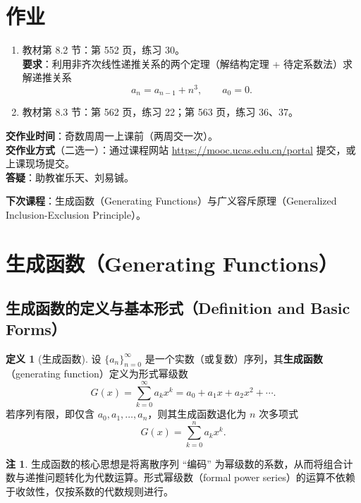 \documentclass[UTF8,11pt,a4paper]{ctexbook}   %
\theoremstyle{definition}
\newtheorem{definition}{定义}[section]
\newtheorem{remark}{注}[section]
\begin{document}
\section*{作业}

\begin{enumerate}
    \item 教材第 8.2 节：第 552 页，练习 30。\\
    \textbf{要求}：利用非齐次线性递推关系的两个定理（解结构定理 + 待定系数法）求解递推关系
    \[
    a_n = a_{n-1} + n^3,\qquad a_0 = 0.
    \]

    \item 教材第 8.3 节：第 562 页，练习 22；第 563 页，练习 36、37。
\end{enumerate}

\textbf{交作业时间}：奇数周周一上课前（两周交一次）。\\
\textbf{交作业方式}（二选一）：通过课程网站 \url{https://mooc.ucas.edu.cn/portal} 提交，或上课现场提交。\\
\textbf{答疑}：助教崔乐天、刘易铖。

\textbf{下次课程}：生成函数（Generating Functions）与广义容斥原理（Generalized Inclusion-Exclusion Principle）。

\section{生成函数（Generating Functions）}

\subsection{生成函数的定义与基本形式（Definition and Basic Forms）}

\begin{definition}[生成函数]
设 $\{a_n\}_{n=0}^{\infty}$ 是一个实数（或复数）序列，其\textbf{生成函数}（generating function）定义为形式幂级数
\[
G(x) = \sum_{k=0}^{\infty} a_k x^k = a_0 + a_1 x + a_2 x^2 + \cdots.
\]
若序列有限，即仅含 $a_0,a_1,\dots,a_n$，则其生成函数退化为 $n$ 次多项式
\[
G(x) = \sum_{k=0}^{n} a_k x^k.
\]
\end{definition}

\begin{remark}
生成函数的核心思想是将离散序列 ``编码'' 为幂级数的系数，从而将组合计数与递推问题转化为代数运算。形式幂级数（formal power series）的运算不依赖于收敛性，仅按系数的代数规则进行。
\end{remark}
\end{document}
